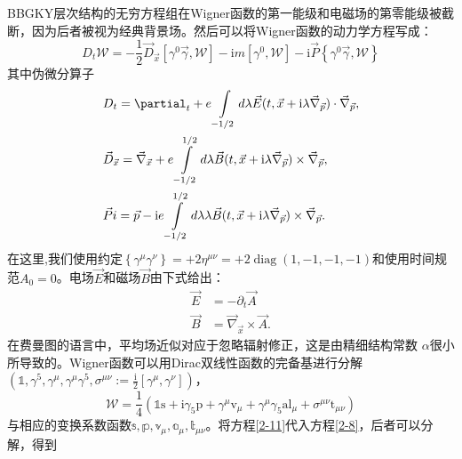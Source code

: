 BBGKY层次结构的无穷方程组在Wigner函数的第一能级和电磁场的第零能级被截断，因为后者被视为经典背景场。然后可以将Wigner函数的动力学方程写成：
\begin{equation}\label{2-8}
    D_t\mathcal{W}=-\frac12\vec{D}_{\vec{x}}\left[\gamma^0\vec{\gamma},\mathcal{W}\right]-\mathrm{i}m\left[\gamma^0,\mathcal{W}\right]-\mathrm{i}\vec{P}\left\{\gamma^0\vec{\gamma},\mathcal{W}\right\}
\end{equation}
其中伪微分算子
\begin{equation}
 \begin{aligned}
&D_{t} =\partial_{t}+e\int\limits_{-1/2}d\lambda\vec{E}(t,\vec{x}+\mathrm{i}\lambda\vec{\nabla}_{\vec{p}})\cdot\vec{\nabla}_{\vec{p}}, \\
&\vec{D}_{\vec{x}} =\vec{\nabla}_{\vec{x}}+e\intop_{-1/2}^{1/2}d\lambda\vec{B}(t,\vec{x}+\mathrm{i}\lambda\vec{\nabla}_{\vec{p}})\times\vec{\nabla}_{\vec{p}}, \\
&\vec{P} i=\vec{p}-\mathrm{i}e\int\limits_{-1/2}^{1/2}d\lambda\lambda\vec{B}(t,\vec{x}+\mathrm{i}\lambda\vec{\nabla}_{\vec{p}})\times\vec{\nabla}_{\vec{p}}. 
\end{aligned}
\end{equation}
在这里,我们使用约定$\left \{  {\gamma^\mu}{\gamma^\nu} \right \}=+2\eta^{\mu\nu}=+2\operatorname{diag}(1,-1,-1,-1)$和使用时间规范$A_0=0$。电场$\vec{E}$和磁场$\vec{B}$由下式给出：
\begin{equation}
    \begin{aligned}\vec{E}&=-\partial_t\vec{A}\\\vec{B}&=\vec{\nabla}_{\vec{x}}\times\vec{A}.\end{aligned}
\end{equation}
在费曼图的语言中，平均场近似对应于忽略辐射修正，这是由精细结构常数 
$\alpha$很小所导致的。Wigner函数可以用Dirac双线性函数的完备基进行分解$(\mathbb{1},\gamma^5,\gamma^\mu,\gamma^\mu\gamma^5,\sigma^{\mu\nu}:=\frac{\mathrm{i}}{2}\left[\gamma^\mu,\gamma^\nu\right])$，
\begin{equation}\label{2-11}
\mathcal{W}=\frac14\left(\mathbb{1}\text{s}+\text{i}\gamma_5\text{p}+\gamma^\mu\text{v}_\mu+\gamma^\mu\gamma_5\text{al}_\mu+\sigma^{\mu\nu}\text{t}_{\mu\nu}\right)
\end{equation}
与相应的变换系数函数$\mathbb{s},\mathbb{p},\mathbb{v_\mu},\mathbb{a_\mu},\mathbb{t_{\mu\nu}}$。将方程\ref{2-11}代入方程\ref{2-8}，后者可以分解，得到
